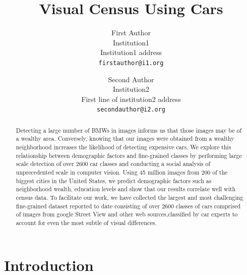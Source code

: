 \documentclass[10pt,twocolumn,letterpaper]{article}
\begin{document}
\title{Visual Census Using Cars}

\author{First Author\\
Institution1\\
Institution1 address\\
{\tt\small firstauthor@i1.org}
\and
Second Author\\
Institution2\\
First line of institution2 address\\
{\tt\small secondauthor@i2.org}
}

\maketitle

\section{Introduction}

\begin{abstract}
Detecting a large number of BMWs in images informs us that those images may be of a wealthy area. Conversely, knowing that our images were obtained from a wealthy neighborhood increases the likelihood of detecting expensive cars. We explore this relationship between demographic factors and fine-grained classes by performing large scale detection of over 2600 car classes and conducting a social analysis of unprecedented scale in computer vision. Using 45 million images from 200 of the biggest cities in the United States, we predict demographic factors such as neighborhood wealth, education levels and show that our results correlate well with census data. To facilitate our work, we have collected the largest and most challenging fine-grained dataset reported to date consisting of over 2600 classes of cars comprised of images from google Street View and other web sources,classified by car experts to account for even the most subtle of visual differences. 
\end{abstract}
\end{document}
